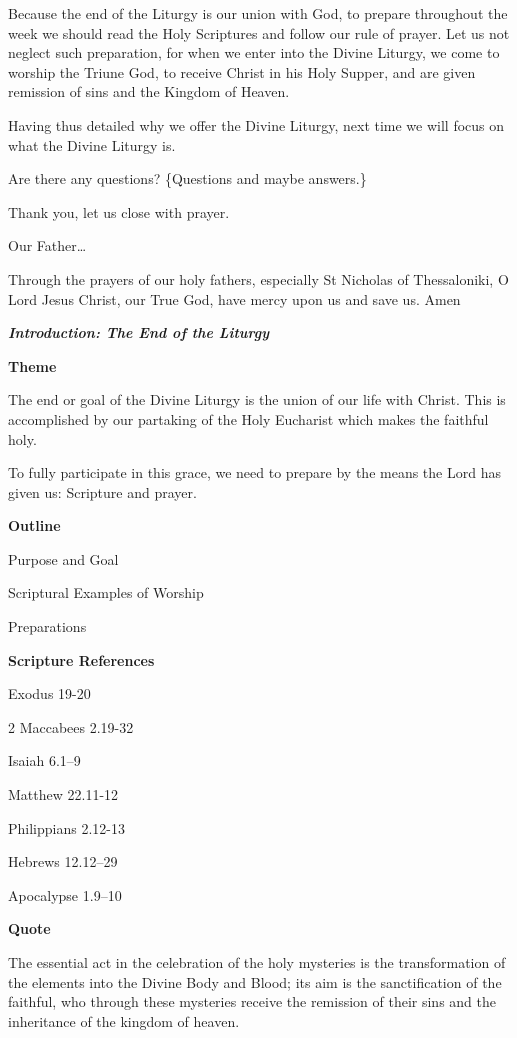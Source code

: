 \documentclass[
]{article}
\begin{document}
Because the end of the Liturgy is our union with God, to prepare
throughout the week we should read the Holy Scriptures and follow our
rule of prayer. Let us not neglect such preparation, for when we enter
into the Divine Liturgy, we come to worship the Triune God, to receive
Christ in his Holy Supper, and are given remission of sins and the
Kingdom of Heaven.

Having thus detailed why we offer the Divine Liturgy, next time we will
focus on what the Divine Liturgy is.

Are there any questions? \{Questions and maybe answers.\}

Thank you, let us close with prayer.

Our Father\ldots{}

Through the prayers of our holy fathers, especially St Nicholas of
Thessaloniki, O Lord Jesus Christ, our True God, have mercy upon us and
save us. Amen

\textbf{\emph{Introduction: The End of the Liturgy}}

\textbf{Theme}

The end or goal of the Divine Liturgy is the union of our life with
Christ. This is accomplished by our partaking of the Holy Eucharist
which makes the faithful holy.

To fully participate in this grace, we need to prepare by the means the
Lord has given us: Scripture and prayer.

\textbf{Outline}

Purpose and Goal

Scriptural Examples of Worship

Preparations

\textbf{Scripture References}

Exodus 19-20

2 Maccabees 2.19-32

Isaiah 6.1--9

Matthew 22.11-12

Philippians 2.12-13

Hebrews 12.12--29

Apocalypse 1.9--10

\textbf{Quote}

The essential act in the celebration of the holy mysteries is the
transformation of the elements into the Divine Body and Blood; its aim
is the sanctification of the faithful, who through these mysteries
receive the remission of their sins and the inheritance of the kingdom
of heaven.
\end{document}
